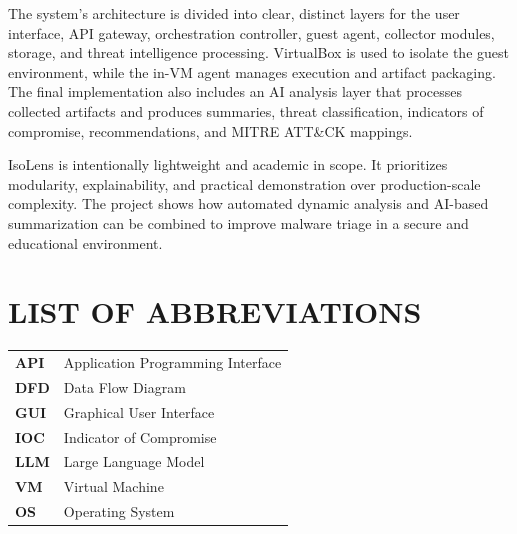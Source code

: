 \documentclass[a4paper,12pt,oneside]{report}
\begin{document}
\par

\par

The system's architecture is divided into clear, distinct layers for the user interface, API gateway, orchestration controller, guest agent, collector modules, storage, and threat intelligence processing. VirtualBox is used to isolate the guest environment, while the in-VM agent manages execution and artifact packaging. The final implementation also includes an AI analysis layer that processes collected artifacts and produces summaries, threat classification, indicators of compromise, recommendations, and MITRE ATT\&CK mappings.

\par

\par

IsoLens is intentionally lightweight and academic in scope. It prioritizes modularity, explainability, and practical demonstration over production-scale complexity. The project shows how automated dynamic analysis and AI-based summarization can be combined to improve malware triage in a secure and educational environment.

\newpage
\tableofcontents

\newpage
\listoffigures
{}

\newpage
\listoftables
{}

\newpage
\chapter*{\uppercase{List of Abbreviations}}
\begin{table}[H]
\renewcommand{\arraystretch}{1.5}
\begin{tabularx}{\textwidth}{>{\bfseries}l X}
API & Application Programming Interface \\
DFD & Data Flow Diagram \\
GUI & Graphical User Interface \\
IOC & Indicator of Compromise \\
LLM & Large Language Model \\
VM & Virtual Machine \\
OS & Operating System \\
\end{tabularx}
\end{table}
\end{document}
